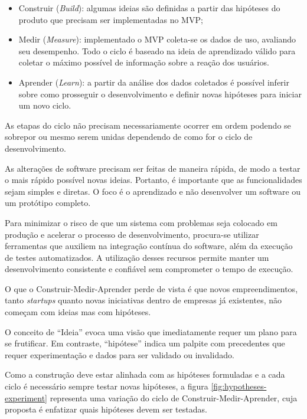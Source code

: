\begin{itemize}
\item Construir (\emph{Build}): algumas ideias são definidas a partir das hipóteses do produto que precisam ser implementadas no MVP;
\item Medir (\emph{Measure}): implementado o MVP coleta-se os dados de uso, avaliando seu desempenho. Todo o ciclo é baseado na ideia de aprendizado válido para coletar o máximo possível de informação sobre a reação dos usuários.
\item Aprender (\emph{Learn}): a partir da análise dos dados coletados é possível inferir sobre como prosseguir o desenvolvimento e definir novas hipóteses para iniciar um novo ciclo.
\end{itemize}
\par As etapas do ciclo não precisam necessariamente ocorrer em ordem podendo se sobrepor ou mesmo serem unidas dependendo de como for o ciclo de desenvolvimento.  \citep{ries:11}
\par As alterações de software precisam ser feitas de maneira rápida, de modo a testar o mais rápido possível novas ideias. Portanto, é importante que as funcionalidades sejam simples e diretas. O foco é o aprendizado e não desenvolver um software ou um protótipo completo.
\par Para minimizar o risco de que um sistema com problemas seja colocado em produção e acelerar o processo de desenvolvimento, procura-se utilizar ferramentas que auxiliem na integração contínua do software, além da execução de testes automatizados. A utilização desses recursos permite manter um desenvolvimento consistente e confiável sem comprometer o tempo de execução.
\par O que o Construir-Medir-Aprender perde de vista é que novos empreendimentos, tanto \emph{startups} quanto novas iniciativas dentro de empresas já existentes, não começam com ideias mas com hipóteses.
\par O conceito de ``Ideia'' evoca uma visão que imediatamente requer um plano para se frutificar. Em contraste, ``hipótese'' indica um palpite com precedentes que requer experimentação e dados para ser validado ou invalidado. \citep{blankendeavor}
\par Como a construção deve estar alinhada com as hipóteses formuladas e a cada ciclo é necessário sempre testar novas hipóteses, a figura \ref{fig:hypotheses-experiment} representa uma variação do ciclo de Construir-Medir-Aprender, cuja proposta é enfatizar quais hipóteses devem ser testadas.

